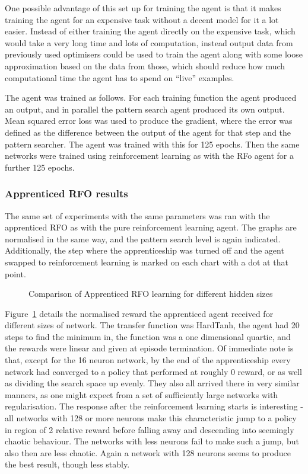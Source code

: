 One possible advantage of this set up for training the agent is that it makes training the agent for an expensive task without a decent model for it a lot easier. Instead of either training the agent directly on the expensive task, which would take a very long time and lots of computation, instead output data from previously used optimisers could be used to train the agent along with some loose approximation based on the data from those, which should reduce how much computational time the agent has to spend on ``live'' examples.

The agent was trained as follows. For each training function the agent produced an output, and in parallel the pattern search agent produced its own output. Mean squared error loss was used to produce the gradient, where the error was defined as the difference between the output of the agent for that step and the pattern searcher. The agent was trained with this for 125 epochs. Then the same networks were trained using reinforcement learning as with the RFo agent for a further 125 epochs.

\subsubsection{Apprenticed RFO results}
The same set of experiments with the same parameters was ran with the apprenticed RFO as with the pure reinforcement learning agent. %
The graphs are normalised in the same way, and the pattern search level is again indicated. Additionally, the step where the apprenticeship was turned off and the agent swapped to reinforcement learning is marked on each chart with a dot at that point.

\begin{figure}
\centering

\caption{Comparison of Apprenticed RFO learning for different hidden sizes}
\label{fig:exp1apprfo}
\end{figure}

Figure~\ref{fig:exp1apprfo} details the normalised reward the apprenticed agent received for different sizes of network. The transfer function was HardTanh, the agent had 20 steps to find the minimum in, the function was a one dimensional quartic, and the rewards were linear and given at episode termination. Of immediate note is that, except for the 16 neuron network, by the end of the apprenticeship every network had converged to a policy that performed at roughly 0 reward, or as well as dividing the search space up evenly. They also all arrived there in very similar manners, as one might expect from a set of sufficiently large networks with regularisation. The response after the reinforcement learning starts is interesting - all networks with 128 or more neurons make this characteristic jump to a policy in region of 2 relative reward before falling away and descending into seemingly chaotic behaviour. The networks with less neurons fail to make such a jump, but also then are less chaotic. Again a network with 128 neurons seems to produce the best result, though less stably.


